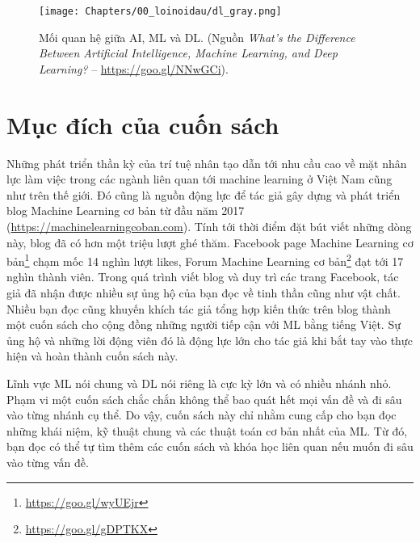 \begin{figure}[]
\centering
    \texttt{[image: Chapters/00\_loinoidau/dl\_gray.png]}
    \caption[]{Mối quan hệ giữa AI, ML và DL. (Nguồn \textit{What’s the Difference Between Artificial
    Intelligence, Machine Learning, and Deep Learning?} --
    \url{https://goo.gl/NNwGCi}).}
    \label{fig:0_1}
\end{figure}

\section{Mục đích của cuốn sách}
Những phát triển thần kỳ của trí tuệ nhân tạo dẫn tới nhu cầu cao về mặt nhân
lực làm việc trong các ngành liên quan tới machine learning ở Việt Nam cũng như
trên thế giới. Đó cũng là nguồn động lực để tác giả gây dựng và phát triển
blog Machine Learning cơ bản từ đầu năm 2017
(\url{https://machinelearningcoban.com}). Tính tới thời điểm đặt bút viết những
dòng này, blog đã có hơn một triệu lượt ghé thăm. Facebook page Machine Learning
cơ bản\footnote{\url{https://goo.gl/wyUEjr}} chạm mốc 14 nghìn lượt likes, Forum
Machine Learning cơ bản\footnote{\url{https://goo.gl/gDPTKX}} đạt tới 17 nghìn
thành viên. Trong quá trình viết blog và duy trì các trang Facebook, tác giả đã
nhận được nhiều sự ủng hộ của bạn đọc về tinh thần cũng như vật chất. Nhiều
bạn đọc cũng khuyến khích tác giả tổng hợp kiến thức trên blog thành một
cuốn sách cho cộng đồng những người tiếp cận với ML bằng tiếng
Việt. Sự ủng hộ và những lời động viên đó là động lực lớn cho tác giả khi bắt
tay vào thực hiện và hoàn thành cuốn sách này.


Lĩnh vực ML nói chung và DL nói riêng là cực kỳ lớn và có nhiều nhánh nhỏ. Phạm vi
một cuốn sách chắc chắn không thể bao quát hết mọi vấn đề và đi sâu vào từng
nhánh cụ thể. Do vậy, cuốn sách này chỉ nhằm cung cấp cho bạn đọc những
khái niệm, kỹ thuật chung và các thuật toán cơ bản nhất của ML. Từ đó, bạn đọc
có thể tự tìm thêm các cuốn sách và khóa học liên quan nếu muốn đi sâu vào từng
vấn đề.



